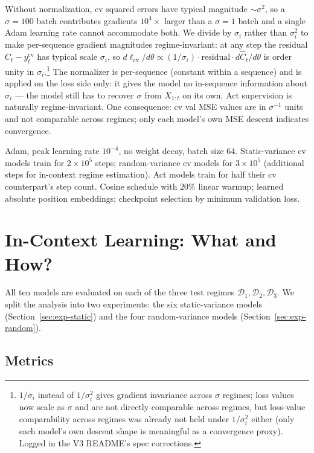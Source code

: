 \documentclass[11pt]{article}
\begin{document}
Without normalization, cv squared errors have typical magnitude $\sim \sigma^2$, so a $\sigma = 100$ batch contributes gradients $10^4 \times$ larger than a $\sigma = 1$ batch and a single Adam learning rate cannot accommodate both. We divide by $\sigma_i$ rather than $\sigma_i^2$ to make per-sequence gradient magnitudes regime-invariant: at any step the residual $\widehat C_t - y_t^{\mathrm{cv}}$ has typical scale $\sigma_i$, so $d\ell_{\mathrm{cv}}/d\theta \propto (1/\sigma_i)\cdot\text{residual}\cdot d\widehat C_t/d\theta$ is order unity in $\sigma_i$.\footnote{$1/\sigma_i$ instead of $1/\sigma_i^2$ gives gradient invariance across $\sigma$ regimes; loss values now scale as $\sigma$ and are not directly comparable across regimes, but loss-value comparability across regimes was already not held under $1/\sigma_i^2$ either (only each model's own descent shape is meaningful as a convergence proxy). Logged in the V3 README's spec corrections.} The normalizer is per-sequence (constant within a sequence) and is applied on the loss side only: it gives the model no in-sequence information about $\sigma_i$ --- the model still has to recover $\sigma$ from $X_{1:t}$ on its own. Act supervision is naturally regime-invariant. One consequence: cv val MSE values are in $\sigma^{-1}$ units and not comparable across regimes; only each model's own MSE descent indicates convergence.

Adam, peak learning rate $10^{-4}$, no weight decay, batch size $64$. Static-variance cv models train for $2 \times 10^5$ steps; random-variance cv models for $3 \times 10^5$ (additional steps for in-context regime estimation). Act models train for half their cv counterpart's step count. Cosine schedule with $20\%$ linear warmup; learned absolute position embeddings; checkpoint selection by minimum validation loss.

\section{In-Context Learning: What and How?}
\label{sec:experiments}

All ten models are evaluated on each of the three test regimes $\mathcal{D}_1, \mathcal{D}_2, \mathcal{D}_3$. We split the analysis into two experiments: the six static-variance models (Section~\ref{sec:exp-static}) and the four random-variance models (Section~\ref{sec:exp-random}).

\subsection{Metrics}
\end{document}
